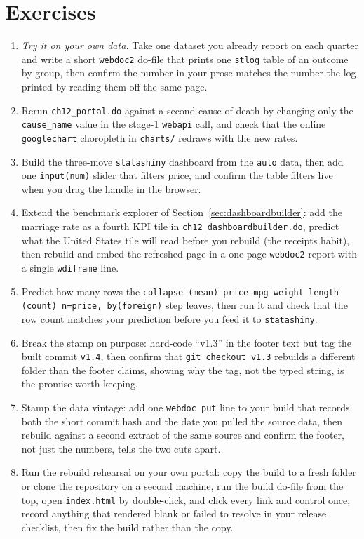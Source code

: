 \section*{Exercises}
\begin{enumerate}
\item \emph{Try it on your own data.} Take one dataset you already report on each quarter and write a short \texttt{webdoc2} do-file that prints one \texttt{stlog} table of an outcome by group, then confirm the number in your prose matches the number the log printed by reading them off the same page.
\item Rerun \texttt{ch12\_portal.do} against a second cause of death by changing only the \texttt{cause\_name} value in the stage-1 \texttt{webapi} call, and check that the online \texttt{googlechart} choropleth in \texttt{charts/} redraws with the new rates.
\item Build the three-move \texttt{statashiny} dashboard from the \texttt{auto} data, then add one \texttt{input(num)} slider that filters price, and confirm the table filters live when you drag the handle in the browser.
\item Extend the benchmark explorer of Section~\ref{sec:dashboardbuilder}: add the marriage rate as a fourth KPI tile in \texttt{ch12\_dashboardbuilder.do}, predict what the United States tile will read before you rebuild (the receipts habit), then rebuild and embed the refreshed page in a one-page \texttt{webdoc2} report with a single \texttt{wdiframe} line.
\item Predict how many rows the \texttt{collapse (mean) price mpg weight length (count) n=price, by(foreign)} step leaves, then run it and check that the row count matches your prediction before you feed it to \texttt{statashiny}.
\item Break the stamp on purpose: hard-code \enquote{v1.3} in the footer text but tag the built commit \texttt{v1.4}, then confirm that \texttt{git checkout v1.3} rebuilds a different folder than the footer claims, showing why the tag, not the typed string, is the promise worth keeping.
\item Stamp the data vintage: add one \texttt{webdoc put} line to your build that records both the short commit hash and the date you pulled the source data, then rebuild against a second extract of the same source and confirm the footer, not just the numbers, tells the two cuts apart.
\item Run the rebuild rehearsal on your own portal: copy the build to a fresh folder or clone the repository on a second machine, run the build do-file from the top, open \texttt{index.html} by double-click, and click every link and control once; record anything that rendered blank or failed to resolve in your release checklist, then fix the build rather than the copy.
\end{enumerate}
